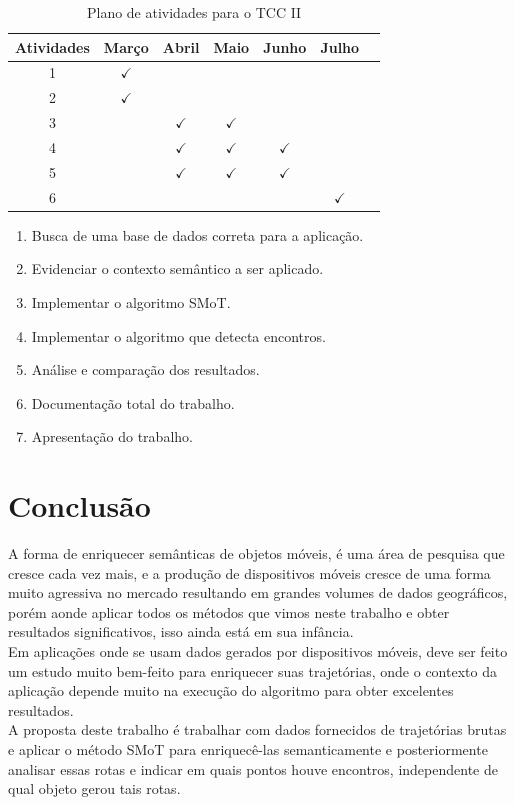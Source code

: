 \documentclass[	12pt, Times, openright, twoside, a4paper, english, brazil]{abntex2}
\begin{document}
\begin{table}[!ht]
	\centering
		\caption{Plano de atividades para o TCC II}	\label{tab:plano}
		\begin{tabular}{|c|c|c|c|c|c|c|}
			\hline  \textbf{Atividades} &	\textbf{Março} &	\textbf{Abril} & \textbf{Maio} & \textbf{Junho} & \textbf{Julho} \\
			\hline 1 & $\checkmark$ 	& & & & 	\\
			\hline 2 & $\checkmark$	& & & & 	\\
			\hline 3 & 	&$\checkmark$ &$\checkmark$ & & 	\\
			\hline 4 & 	&$\checkmark$ &$\checkmark$ &$\checkmark$ & 	\\
			\hline 5 & 	&$\checkmark$ &$\checkmark$ &$\checkmark$ & 	\\
            \hline 6 &  & & & &$\checkmark$ 	\\
			\hline 
		\end{tabular}
\end{table}
\begin{enumerate}
\item Busca de uma base de dados correta para a aplicação.
\item Evidenciar o contexto semântico a ser aplicado.
\item Implementar o algoritmo SMoT.
\item Implementar o algoritmo que detecta encontros.
\item Análise e comparação dos resultados.
\item Documentação total do trabalho.
\item Apresentação do trabalho.
\end{enumerate}

\chapter{Conclusão}
A forma de enriquecer semânticas de objetos móveis, é uma área de pesquisa que cresce cada vez mais, e a produção de dispositivos móveis cresce de uma forma muito agressiva no mercado resultando em grandes volumes de dados geográficos, porém aonde aplicar todos os métodos que vimos neste trabalho e obter resultados significativos, isso ainda está em sua infância. \\
\indent	Em aplicações onde se usam dados gerados por dispositivos móveis, deve ser feito um estudo muito bem-feito para enriquecer suas trajetórias, onde o contexto da aplicação depende muito na execução do algoritmo para obter excelentes resultados.\\
\indent	A proposta deste trabalho é trabalhar com dados fornecidos de trajetórias brutas e aplicar o método SMoT para enriquecê-las semanticamente e posteriormente analisar essas rotas e indicar em quais pontos houve encontros, independente de qual objeto gerou tais rotas.
\end{document}
